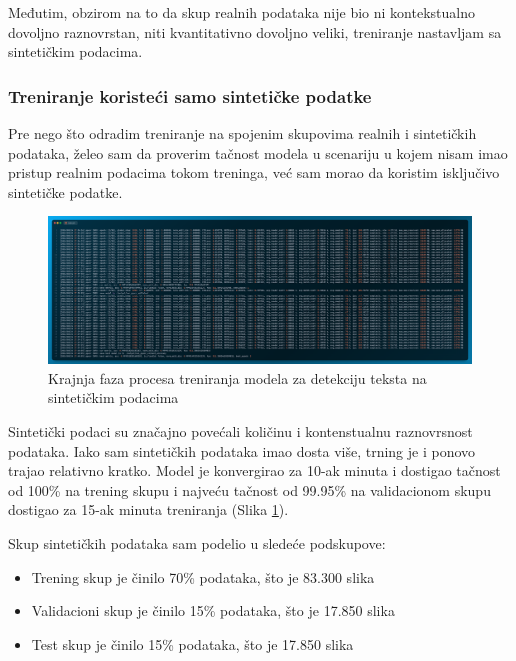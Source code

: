 \documentclass[a4paper,12pt]{article}
\begin{document}
	Međutim, obzirom na to da skup realnih podataka nije bio ni kontekstualno dovoljno raznovrstan, niti kvantitativno dovoljno veliki, treniranje nastavljam sa sintetičkim podacima.
	
	\subsubsection{Treniranje koristeći samo sintetičke podatke}
	Pre nego što odradim treniranje na spojenim skupovima realnih i sintetičkih podataka, želeo sam da proverim tačnost modela u scenariju u kojem nisam imao pristup realnim podacima tokom treninga, već sam morao da koristim isključivo sintetičke podatke.
	
	\begin{figure}[H]
		\centering
		\includegraphics[width=\textwidth]{assets/train-code-synthetic-data.png}
		\caption{Krajnja faza procesa treniranja modela za detekciju teksta na sintetičkim podacima}
		\label{fig:train-code-synthetic-data}
	\end{figure}
	
	Sintetički podaci su značajno povećali količinu i kontenstualnu raznovrsnost podataka. Iako sam sintetičkih podataka imao dosta više, trning je i ponovo trajao relativno kratko. Model je konvergirao za 10-ak minuta i dostigao tačnost od 100\% na trening skupu i najveću tačnost od 99.95\% na validacionom skupu dostigao za 15-ak minuta treniranja (Slika \ref{fig:train-code-synthetic-data}).\newline
	
	Skup sintetičkih podataka sam podelio u sledeće podskupove:
	\begin{itemize}
		\item Trening skup je činilo 70\% podataka, što je 83.300 slika
		\item Validacioni skup je činilo 15\% podataka, što je 17.850 slika
		\item Test skup je činilo 15\% podataka, što je 17.850 slika
	\end{itemize}
\end{document}
